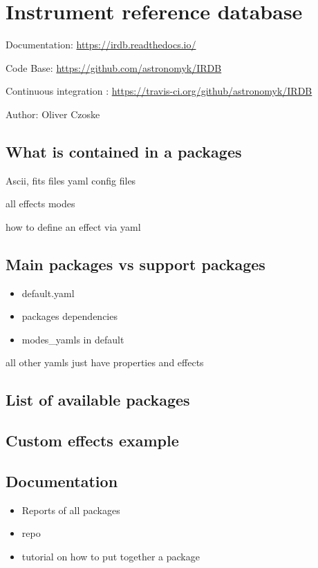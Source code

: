 

\section{Instrument reference database%
  \label{instrument-reference-database}%
}

Documentation: \url{https://irdb.readthedocs.io/}

Code Base: \url{https://github.com/astronomyk/IRDB}

Continuous integration : \url{https://travis-ci.org/github/astronomyk/IRDB}

Author: Oliver Czoske


\subsection{What is contained in a packages%
  \label{what-is-contained-in-a-packages}%
}

Ascii, fits files
yaml config files

all effects
modes

how to define an effect via yaml


\subsection{Main packages vs support packages%
  \label{main-packages-vs-support-packages}%
}

\begin{itemize}
\item default.yaml

\item packages dependencies

\item modes\_yamls in default
\end{itemize}

all other yamls just have properties and effects


\subsection{List of available packages%
  \label{list-of-available-packages}%
}



\subsection{Custom effects example%
  \label{custom-effects-example}%
}



\subsection{Documentation%
  \label{documentation}%
}

\begin{itemize}
\item Reports of all packages

\item repo

\item tutorial on how to put together a package
\end{itemize}
